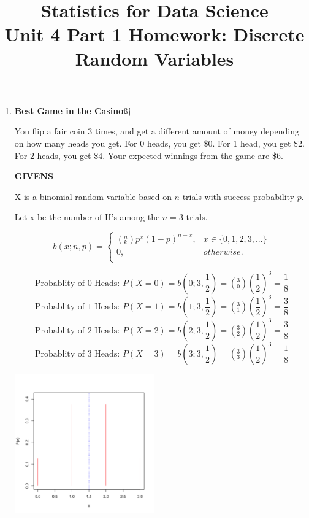 \documentclass[12pt,a4paper]{article}
\numberwithin{equation}{subsection}
\begin{document}


\title{Statistics for Data Science \\
       Unit 4 Part 1 Homework: Discrete Random Variables}
\maketitle


\begin{enumerate}

\item \textbf{Best Game in the Casino}ß†

You flip a fair coin 3 times, and get a different amount of money depending on how many heads you get. For 0 heads, you get \$0. For 1 head, you get \$2. For 2 heads, you get \$4. Your expected winnings from the game are \$6. 

\textbf{GIVENS}

X is a binomial random variable based on $n$ trials with success probability $p$.

Let x be the number of H's among the $n=3$ trials.

$$b(x;n,p) = \begin{cases}
(^n_k)p^x(1-p)^{n-x}, &x \in \{0,1,2,3,...\}\\
0, &otherwise.\\
\end{cases}
$$

$$\text{Probablity of 0 Heads: }P(X=0)=b(0;3,\frac{1}{2}) = (^3_0)(\frac{1}{2})^3 = \frac{1}{8}$$
$$\text{Probablity of 1 Heads: }P(X=1)=b(1;3,\frac{1}{2}) = (^3_1)(\frac{1}{2})^3 = \frac{3}{8}$$
$$\text{Probablity of 2 Heads: }P(X=2)=b(2;3,\frac{1}{2}) = (^3_2)(\frac{1}{2})^3 = \frac{3}{8}$$
$$\text{Probablity of 3 Heads: }P(X=3)=b(3;3,\frac{1}{2}) = (^3_3)(\frac{1}{2})^3 = \frac{1}{8}$$


\begin{minipage}{\linewidth}
  \centering
  \includegraphics[width=6cm]{Kevin_Hartman_unit_4_part_1_hw-xbinom}
\end{minipage}


\end{enumerate}
\end{document}
